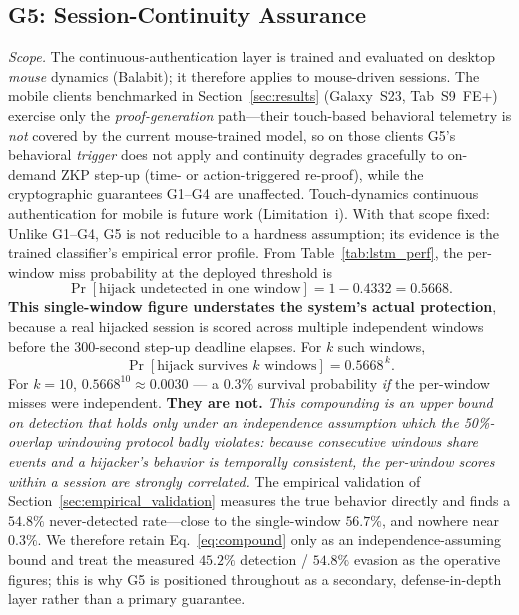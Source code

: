 \documentclass[journal,twoside,10pt]{IEEEtran}
\begin{document}
\subsection{G5: Session-Continuity Assurance}
\emph{Scope.} The continuous-authentication layer is trained and evaluated
on desktop \emph{mouse} dynamics (Balabit); it therefore applies to
mouse-driven sessions. The mobile clients benchmarked in
Section~\ref{sec:results} (Galaxy~S23, Tab~S9~FE+) exercise only the
\emph{proof-generation} path---their touch-based behavioral telemetry is
\emph{not} covered by the current mouse-trained model, so on those clients
G5's behavioral \emph{trigger} does not apply and continuity degrades
gracefully to on-demand ZKP step-up (time- or action-triggered
re-proof), while the cryptographic guarantees G1--G4 are unaffected.
Touch-dynamics continuous authentication for mobile is future work
(Limitation~i). With that scope fixed:
Unlike G1--G4, G5 is not reducible to a hardness assumption; its evidence
is the trained classifier's empirical error profile. From
Table~\ref{tab:lstm_perf}, the per-window miss probability at the deployed
threshold is
\begin{equation}
\Pr[\text{hijack undetected in one window}] = 1-0.4332 = 0.5668.
\label{eq:perwindow}
\end{equation}
\textbf{This single-window figure understates the system's actual
protection}, because a real hijacked session is scored across multiple
independent windows before the 300-second step-up deadline elapses. For
$k$ such windows,
\begin{equation}
\Pr[\text{hijack survives }k\text{ windows}] = 0.5668^{\,k}.
\label{eq:compound}
\end{equation}
For $k=10$, $0.5668^{10}\approx0.0030$ --- a $0.3\%$ survival probability
\emph{if} the per-window misses were independent. \textbf{They are not.}
\textit{This compounding is an upper bound on detection that holds only
under an independence assumption which the 50\%-overlap windowing protocol
badly violates: because consecutive windows share events and a hijacker's
behavior is temporally consistent, the per-window scores within a session
are strongly correlated.} The empirical validation of
Section~\ref{sec:empirical_validation} measures the true behavior directly
and finds a $54.8\%$ never-detected rate---close to the single-window
$56.7\%$, and nowhere near $0.3\%$. We therefore retain
Eq.~\ref{eq:compound} only as an independence-assuming bound and treat the
measured $45.2\%$ detection / $54.8\%$ evasion as the operative figures;
this is why G5 is positioned throughout as a secondary,
defense-in-depth layer rather than a primary guarantee.
\end{document}
